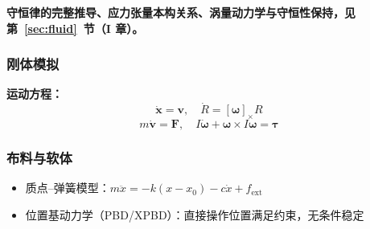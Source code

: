 \textbf{守恒律的完整推导、应力张量本构关系、涡量动力学与守恒性保持，见第~\ref{sec:fluid}~节（I 章）。}

\subsubsection{刚体模拟}

\textbf{运动方程：}
\[
\dot{\mathbf{x}} = \mathbf{v}, \quad \dot{R} = [\boldsymbol{\omega}]_\times R
\]
\[
m\dot{\mathbf{v}} = \mathbf{F}, \quad I\dot{\boldsymbol{\omega}} + \boldsymbol{\omega} \times I\boldsymbol{\omega} = \boldsymbol{\tau}
\]

\subsubsection{布料与软体}

\begin{itemize}
  \item 质点--弹簧模型：$m\ddot{x} = -k(x - x_0) - c\dot{x} + f_{\text{ext}}$
  \item 位置基动力学（PBD/XPBD）：直接操作位置满足约束，无条件稳定
\end{itemize}